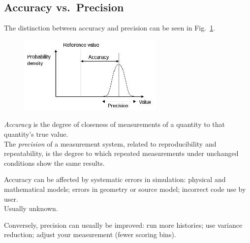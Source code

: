 \documentclass[12pt]{article}
\begin{document}
\subsection*{Accuracy vs.\ Precision}
The distinction between accuracy and precision can be seen in Fig.~\ref{fig:accuracy}.\\
%
\begin{figure}[h!]
\begin{center}
  \includegraphics[height=2 in,clip]{../figs/accuracy-and-precision.jpg}
\end{center}
  \label{fig:accuracy}
\end{figure}
%
\textit{Accuracy} is the degree of closeness of measurements of a quantity to that quantity's true value.\\
The \textit{precision} of a measurement system, related to reproducibility and repeatability, is the degree to which repeated measurements under unchanged conditions show the same results.

Accuracy can be affected by systematic errors in simulation: physical and mathematical models; errors in geometry or source model; incorrect code use by user.\\
Usually unknown.

Conversely, precision can usually be improved: run more histories; use variance reduction; adjust your measurement (fewer scoring bins).

\vspace*{1 em}
\end{document}
